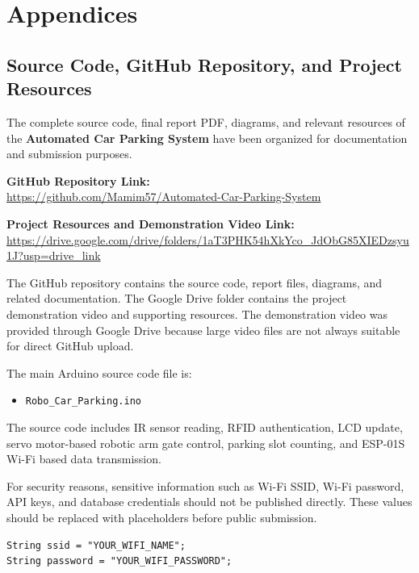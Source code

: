 
\chapter*{Appendices}

\setcounter{section}{0}
\renewcommand{\thesection}{\Alph{section}}

\section{Source Code, GitHub Repository, and Project Resources}

The complete source code, final report PDF, diagrams, and relevant resources of the \textbf{Automated Car Parking System} have been organized for documentation and submission purposes.

\textbf{GitHub Repository Link:} \\
\url{https://github.com/Mamim57/Automated-Car-Parking-System}

\textbf{Project Resources and Demonstration Video Link:} \\
\url{https://drive.google.com/drive/folders/1aT3PHK54hXkYco_JdObG85XIEDzsyu1J?usp=drive_link}

The GitHub repository contains the source code, report files, diagrams, and related documentation. The Google Drive folder contains the project demonstration video and supporting resources. The demonstration video was provided through Google Drive because large video files are not always suitable for direct GitHub upload.

The main Arduino source code file is:

\begin{itemize}
    \item \texttt{Robo\_Car\_Parking.ino}
\end{itemize}

The source code includes IR sensor reading, RFID authentication, LCD update, servo motor-based robotic arm gate control, parking slot counting, and ESP-01S Wi-Fi based data transmission.

For security reasons, sensitive information such as Wi-Fi SSID, Wi-Fi password, API keys, and database credentials should not be published directly. These values should be replaced with placeholders before public submission.

\begin{lstlisting}
String ssid = "YOUR_WIFI_NAME";
String password = "YOUR_WIFI_PASSWORD";
\end{lstlisting}

